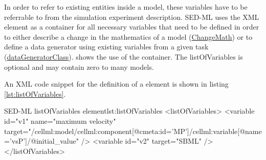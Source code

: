 \label{sec:listOfVariables}
In order to refer to existing entities inside a model, these variables have to be referrable to from the simulation experiment description. SED-ML uses the XML  element as a container for all necessary variables that need to be defined in order to either describe a change in the mathematics of a model (\hyperref[class:changeMath]{ChangeMath}) or to define a data generator using existing variables from a given task (\hyperref[lass:dataGenerator]{dataGeneratorClass}).  shows the use of the  container. The listOfVariables is optional and may contain zero to many models. 

%

An XML code snippet for the definition of a  element is shown in listing \ref{lst:listOfVariables}.
%
\begin{myXmlLst}{SED-ML listOfVariables element}{lst:listOfVariables}
<listOfVariables>
 <variable id="v1" name="maximum velocity" target="/cellml:model/cellml:component[@cmeta:id='MP']/cellml:variable[@name='vsP']/@initial_value" />
 <variable id="v2" target="SBML" />
</listOfVariables>
\end{myXmlLst}
%

